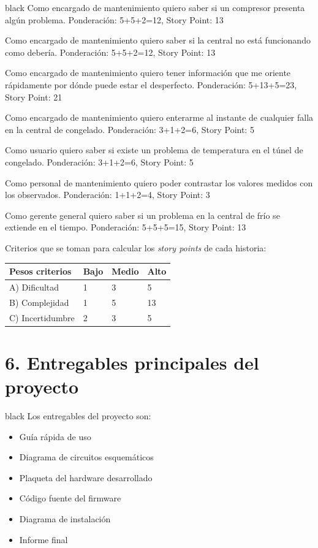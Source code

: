 \documentclass[
11pt, %
]{charter}
\begin{document}
\begin{consigna}{black}
Como encargado de mantenimiento quiero saber si un compresor presenta algún problema. Ponderación: 5+5+2=12, Story Point: 13

Como encargado de mantenimiento quiero saber si la central no está funcionando como debería. Ponderación: 5+5+2=12, Story Point: 13

Como encargado de mantenimiento quiero tener información que me oriente rápidamente por dónde puede estar el desperfecto. Ponderación: 5+13+5=23, Story Point: 21

Como encargado de mantenimiento quiero enterarme al instante de cualquier falla en la central de congelado. Ponderación: 3+1+2=6, Story Point: 5

Como usuario quiero saber si existe un problema de temperatura en el túnel de congelado. Ponderación: 3+1+2=6, Story Point: 5

Como personal de mantenimiento quiero poder contrastar los valores medidos con los observados. Ponderación: 1+1+2=4, Story Point: 3

Como gerente general quiero saber si un problema en la central de frío se extiende en el tiempo. Ponderación: 5+5+5=15, Story Point: 13


Criterios que se toman para calcular los \textit{story points} de cada historia:

\begin{table}[ht]
\begin{tabularx}{\linewidth}{@{}|l|X|X|l|@{}}
\hline
\rowcolor[HTML]{C0C0C0} 
Pesos criterios  & Bajo & Medio	& Alto \\ \hline
A) Dificultad    & 1    & 3      & 5 \\ \hline
B) Complejidad   & 1    & 5      & 13 \\ \hline
C) Incertidumbre & 2	    & 3      & 5	 \\ \hline
\end{tabularx}
\end{table}

\end{consigna}

\section{6. Entregables principales del proyecto}
\label{sec:entregables}
\begin{consigna}{black}
Los entregables del proyecto son:
\begin{itemize}
	\item Guía rápida de uso
	\item Diagrama de circuitos esquemáticos
	\item Plaqueta del hardware desarrollado
	\item Código fuente del firmware
	\item Diagrama de instalación
	\item Informe final
\end{itemize}

\end{consigna}
\end{document}
